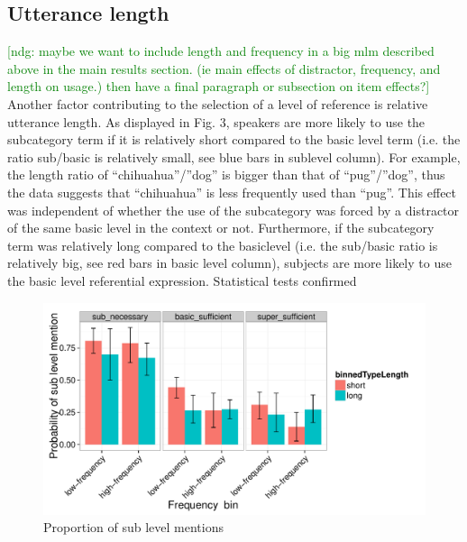 \documentclass[10pt,letterpaper]{article}
\newcommand{\ndg}[1]{\textcolor{Green}{[ndg: #1]}}
\begin{document}
\subsection{\bf Utterance length}
\ndg{maybe we want to include length and frequency in a big mlm described above in the main results section. (ie main effects of distractor, frequency, and length on usage.) then have a final paragraph or subsection on item effects?}
Another factor contributing to the selection of a level of reference is relative utterance length. As displayed in Fig. 3, speakers are more likely to use the subcategory term if it is relatively short compared to the basic level term (i.e. the ratio sub/basic is relatively small, see blue bars in sublevel column). For example, the length ratio of ``chihuahua''/''dog'' is bigger than that of ``pug''/''dog'', thus the data suggests that ``chihuahua'' is less frequently used than ``pug''. This effect was independent of whether the use of the subcategory was forced by a distractor of the same basic level in the context or not. Furthermore, if the subcategory term was relatively long compared to the basiclevel (i.e. the sub/basic ratio is relatively big, see red bars in basic level column), subjects are more likely to use the basic level referential expression. Statistical tests confirmed

\begin{figure}[ht!]
\centering
\includegraphics[width=.5\textwidth]{graphs/freq-length-interaction-bycond}
\caption{Proportion of sub level mentions  }
\label{fig:lengthfreqinteraction}
\end{figure}


\end{document}
